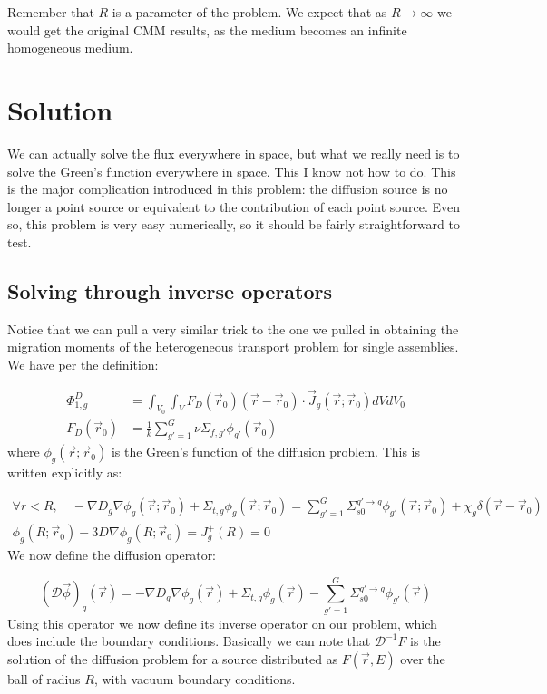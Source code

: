\documentclass[a4paper,letterpaper,12pt,oneside,draft]{article}
\newcommand{\OpD}{\mathcal{D}}
\newcommand{\sumener}[2][]{\sum_{g#1=1}^{G}{#2}}
\newcommand{\vr}{\ensuremath{\vec{r}}}
\newcommand{\dvr}{\left(\vr-\vr_0\right)}
\begin{document}
    Remember that $R$ is a parameter of the problem. We expect that as $R\to\infty$ we would get the original CMM results, as the medium becomes an infinite homogeneous medium.
    
    \section{Solution}
    We can actually solve the flux everywhere in space, but what we really need is to solve the Green's function everywhere in space. 
    This I know not how to do. 
    This is the major complication introduced in this problem: the diffusion source is no longer a point source or equivalent to the contribution of each point source. 
    Even so, this problem is very easy numerically, so it should be fairly straightforward to test.
    
    \subsection{Solving through inverse operators}
    Notice that we can pull a very similar trick to the one we pulled in obtaining the migration moments of the heterogeneous transport problem for single assemblies. We have per the definition:
    
    \begin{align}
    \label{eq:def:Moment1}
        \Phi_{1,g}^D & = \int_{V_0}\int_{V}F_D(\vr_0)\dvr\cdot \vec{J}_g(\vr;\vr_0)dVdV_0 \\
        F_D(\vr_0) & = \frac{1}{k}\sumener[']{\nu\Sigma_{f,g'}\phi_{g'}(\vr_0)}
    \end{align}
    where $\phi_g(\vr;\vr_0)$ is the Green's function of the diffusion problem. This is written explicitly as:
    
    \begin{gather}
        \label{eq:Diff:Green}
        \forall r<R, \quad-\nabla D_g\nabla\phi_g(\vr;\vr_0) + \Sigma_{t,g}\phi_g(\vr;\vr_0) = \sumener[']{\Sigma_{s0}^{g'\to g}\phi_{g'}(\vr;\vr_0)} + \chi_g\delta\dvr \\
        \label{eq:Diff:Green:BC}
        \phi_g(R;\vr_0) - 3D\nabla\phi_g(R;\vr_0) = J^+_g(R) = 0
    \end{gather}
    We now define the diffusion operator:
    
    \begin{equation}
    \label{eq:def:DiffOp}
    \left(\OpD\vec{\phi}\right)_g(\vr) = -\nabla D_g \nabla \phi_g(\vr) + \Sigma_{t,g}\phi_g(\vr) - \sumener[']{\Sigma_{s0}^{g'\to g}\phi_{g'}(\vr)}
    \end{equation}
    Using this operator we now define its inverse operator on our problem, which does include the boundary conditions. Basically we can note that $\OpD^{-1}F$ is the solution of the diffusion problem for a source distributed as $F(\vr,E)$ over the ball of radius $R$, with vacuum boundary conditions.
    
\end{document}
